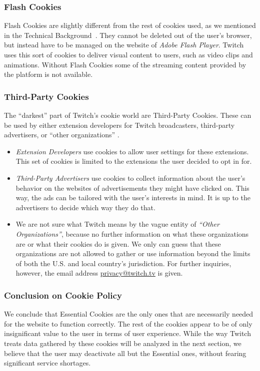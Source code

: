 \subsubsection{Flash Cookies}
Flash Cookies are slightly different from the rest of cookies used, as we mentioned in the Technical Background~. They cannot be deleted out of the user's browser, but instead have to be managed on the website of \textit{Adobe Flash Player}. Twitch uses this sort of cookies to deliver visual content to users, such as video clips and animations. Without Flash Cookies some of the streaming content provided by the platform is not available. 

\subsubsection{Third-Party Cookies}
The ``darkest'' part of Twitch's cookie world are Third-Party Cookies. These can be used by either extension developers for Twitch broadcasters, third-party advertisers, or ``other organizations'' \cite[Section~3]{twitch-cookie-policy}. 
\begin{itemize}
	\item \textit{Extension Developers} use cookies to allow user settings for these extensions. This set of cookies is limited to the extensions the user decided to opt in for. 
	\item \textit{Third-Party Advertisers} use cookies to collect information about the user's behavior on the websites of advertisements they might have clicked on. This way, the ads can be tailored with the  user's interests in mind. It is up to the advertisers to decide which way they do that. 
	\item We are not sure what Twitch means by the vague entity of \textit{``Other Organizations''}, because no further information on what these organizations are or what their cookies do is given. We only can guess that these organizations are not allowed to gather or use information beyond the limits of both the U.S. and local country's jurisdiction. For further inquiries, however, the email address \url{privacy@twitch.tv} is given. 
\end{itemize}

\subsubsection{Conclusion on Cookie Policy}
We conclude that Essential Cookies are the only ones that are necessarily needed for the website to function correctly. The rest of the cookies appear to be of only insignificant value to the user in terms of user experience. While the way Twitch treats data gathered by these cookies will be analyzed in the next section, we believe that the user may deactivate all but the Essential ones, without fearing significant service shortages. %


